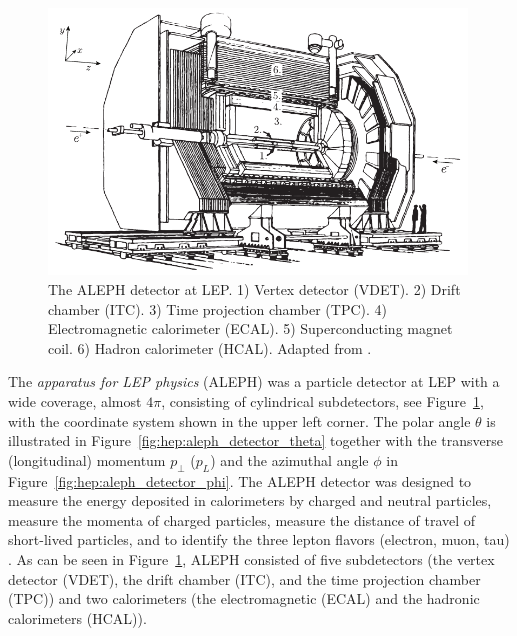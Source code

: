 \begin{figure}
  \centerfloat
  \includegraphics[width=0.99\textwidth]{figures/ALEPH/aleph.pdf}
  \caption[The ALEPH detector]{The ALEPH detector at LEP. 1) Vertex detector (VDET). 2) Drift chamber (ITC). 3) Time projection chamber (TPC). 4) Electromagnetic calorimeter (ECAL). 5) Superconducting magnet coil. 6) Hadron calorimeter (HCAL). Adapted from \citet{buskulicInvestigationBd0Bs01994}.}
  \label{fig:hep:aleph_detector}
\end{figure}

The \emph{apparatus for LEP physics} (ALEPH) was a particle detector at LEP with a wide coverage, almost $4 \pi$, consisting of cylindrical subdetectors, see Figure~\ref{fig:hep:aleph_detector}, with the coordinate system shown in the upper left corner. The polar angle $\theta$ is illustrated in Figure~\ref{fig:hep:aleph_detector_theta} together with the transverse (longitudinal) momentum $p_\perp$ ($p_L$) and the azimuthal angle $\phi$ in Figure~\ref{fig:hep:aleph_detector_phi}. The ALEPH detector was designed to measure the energy deposited in calorimeters by charged and neutral particles, measure the momenta of charged particles, measure the distance of travel of short-lived particles, and to identify the three lepton flavors (electron, muon, tau) \autocite{buskulicInvestigationBd0Bs01994}. As can be seen in Figure~\ref{fig:hep:aleph_detector}, ALEPH consisted of five subdetectors (the vertex detector (VDET), the drift chamber (ITC), and the time projection chamber (TPC)) and two calorimeters (the electromagnetic (ECAL) and the hadronic calorimeters (HCAL)). 

